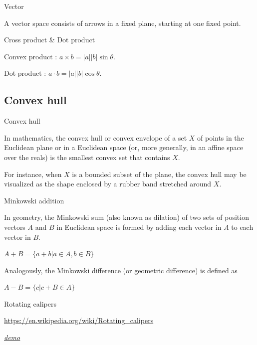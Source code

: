 \documentclass[UTF8]{beamer}
\begin{document}
	\begin{frame}{Vector}

	A vector space consists of arrows in a fixed plane, starting at one fixed point.

	\end{frame}

	\begin{frame}{Cross product \& Dot product}

	Convex product : $a \times b = |a||b| \sin \theta$.

	Dot product : $a \cdot b = |a||b| \cos \theta$.

	\end{frame}

	\subsection{Convex hull}

	\begin{frame}{Convex hull}

	In mathematics, the convex hull or convex envelope of a set $X$ of points in the Euclidean plane or in a Euclidean space (or, more generally, in an affine space over the reals) is the smallest convex set that contains $X$. 

	For instance, when $X$ is a bounded subset of the plane, the convex hull may be visualized as the shape enclosed by a rubber band stretched around $X$.

	\end{frame}

	\begin{frame}{Minkowski addition}

	In geometry, the Minkowski sum (also known as dilation) of two sets of position vectors $A$ and $B$ in Euclidean space is formed by adding each vector in $A$ to each vector in $B$.

	$A + B = \{ a + b | a \in A, b \in B \}$

	Analogously, the Minkowski difference (or geometric difference) is defined as

	$A - B = \{ c | c + B \in A \}$

	\end{frame}

	\begin{frame}{Rotating calipers}

	\url{https://en.wikipedia.org/wiki/Rotating_calipers}

	\href{Rotating_calipers.gif}{\emph{\underline{demo}}}

	\end{frame}
\end{document}
